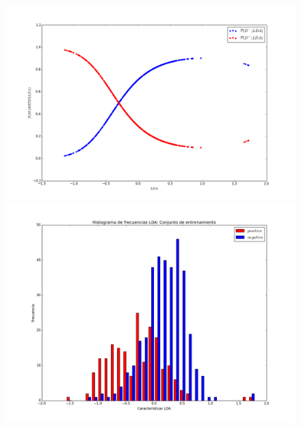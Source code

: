 \documentclass[letter, titlepage, 10pt]{article}
\begin{document}
\begin{appendices}
  \begin{figure}[H]
  \centering
    \begin{minipage}{.5\textwidth}
        \centering
        \includegraphics[width=1\linewidth]{images/CP_D3}
    \end{minipage}%
    \begin{minipage}{.5\textwidth}
        \centering
        \includegraphics[width=1\linewidth]{images/Histograma_D4}
    \end{minipage}
\end{figure}


\end{appendices}
\end{document}
